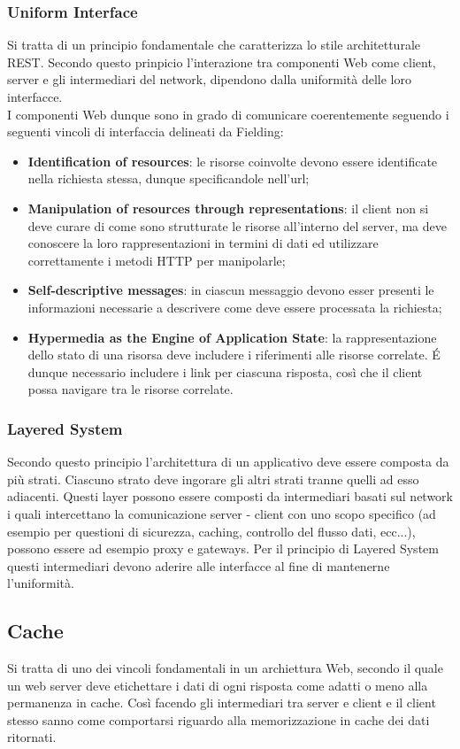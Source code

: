 \subsubsection*{Uniform Interface}
Si tratta di un principio fondamentale che caratterizza lo stile architetturale REST. Secondo questo prinpicio l'interazione tra componenti Web come client, server e gli intermediari del network, dipendono dalla uniformità delle loro interfacce.\\
I componenti Web dunque sono in grado di comunicare coerentemente seguendo i seguenti vincoli di interfaccia delineati da Fielding:
\begin{itemize}
  \item \textbf{Identification of resources}: le risorse coinvolte devono essere identificate nella richiesta stessa, dunque specificandole nell'url;
  \item \textbf{Manipulation of resources through representations}: il client non si deve curare di come sono strutturate le risorse all'interno del server, ma deve conoscere la loro rappresentazioni in termini di dati ed utilizzare correttamente i metodi HTTP per manipolarle;
  \item \textbf{Self-descriptive messages}: in ciascun messaggio devono esser presenti le informazioni necessarie a descrivere come deve essere processata la richiesta;
  \item \textbf{Hypermedia as the Engine of Application State}: la rappresentazione dello stato di una risorsa deve includere i riferimenti alle risorse correlate. É dunque necessario includere i link per ciascuna risposta, così che il client possa navigare tra le risorse correlate.
\end{itemize}
\subsubsection*{Layered System}
Secondo questo principio l'architettura di un applicativo deve essere composta da più strati. Ciascuno strato deve ingorare gli altri strati tranne quelli ad esso adiacenti. Questi layer possono essere composti da intermediari basati sul network i quali intercettano la comunicazione server - client con uno scopo specifico (ad esempio per questioni di sicurezza, caching, controllo del flusso dati, ecc...), possono essere ad esempio proxy e gateways. Per il principio di Layered System questi intermediari devono aderire alle interfacce al fine di mantenerne l'uniformità.
\subsection*{Cache}
Si tratta di uno dei vincoli fondamentali in un archiettura Web, secondo il quale un web server deve etichettare i dati di ogni risposta come adatti o meno alla permanenza in cache. Così facendo gli intermediari tra server e client e il client stesso sanno come comportarsi riguardo alla memorizzazione in cache dei dati ritornati.
